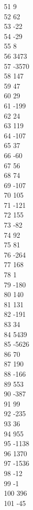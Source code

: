 { 51	9 \\
 52	62 \\
 53	-22 \\
 54	-29 \\
 55	8 \\
 56	3473 \\
 57	-3570 \\
 58	147 \\
 59	47 \\
 60	29 \\
 61	-199 \\
 62	24 \\
 63	119 \\
 64	-107 \\
 65	37 \\
 66	-60 \\
 67	56 \\
 68	74 \\
 69	-107 \\
 70	105 \\
 71	-121 \\
 72	155 \\
 73	-82 \\
 74	92 \\
 75	81 \\
 76	-264 \\
 77	168 \\
 78	1 \\
 79	-180 \\
 80	140 \\
 81	131 \\
 82	-191 \\
 83	34 \\
 84	5439 \\
 85	-5626 \\
 86	70 \\
 87	190 \\
 88	-166 \\
 89	553 \\
 90	-387 \\
 91	99 \\
 92	-235 \\
 93	36 \\
 94	955 \\
 95	-1138 \\
 96	1370 \\
 97	-1536 \\
 98	-12 \\
 99	-1 \\
 100	396 \\
 101	-45 \\
}
